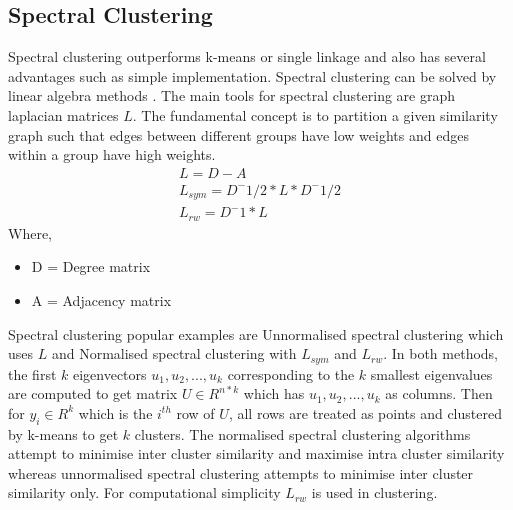 \subsection{Spectral Clustering}

Spectral clustering outperforms k-means or single linkage and also has several advantages such as simple implementation. Spectral clustering can be solved by linear algebra methods \cite{aps:50}. The main tools for spectral clustering are graph laplacian matrices $L$. The fundamental concept is to partition a given similarity graph such that edges between different groups have low weights and edges within a group have high weights. \\
\begin{align}
L = D - A\\
L_{sym} = D^-1/2*L*D^-1/2\\
L_{rw} = D^-1*L
\end{align} 
Where,
\begin{itemize}
\item D = Degree matrix
\item A = Adjacency matrix\\
\end{itemize}
Spectral clustering popular examples are Unnormalised spectral clustering which uses $L$ and Normalised spectral clustering with $L_{sym}$ and $L_{rw}$. In both methods, the first $k$ eigenvectors $u_1,u_2,...,u_k$ corresponding to the $k$ smallest eigenvalues are computed to get matrix $U \in R^{n*k}$ which has $u_1,u_2,...,u_k$ as columns. Then for $y_i \in R^k$ which is the $i^{th}$ row of $U$, all rows are treated as points and clustered by k-means to get $k$ clusters. The normalised spectral clustering algorithms attempt to minimise inter cluster similarity and maximise intra cluster similarity whereas unnormalised spectral clustering attempts to minimise inter cluster similarity only. For computational simplicity $L_{rw}$ is used in clustering.   



%
%

